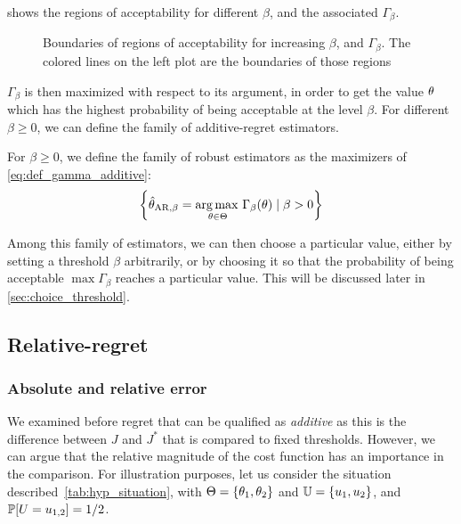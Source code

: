 \documentclass[../../Main_ManuscritThese.tex]{subfiles}
\newcommand\imgpath{/home/victor/acadwriting/Manuscrit/Text/Chapter3/img/}
\begin{document}
   shows the regions of acceptability for different $\beta$, and the associated $\Gamma_{\beta}$.

\begin{figure}[ht]
  \centering
  
  \caption{\label{fig:gamma_beta_increasing} Boundaries of regions of acceptability for increasing $\beta$, and $\Gamma_{\beta}$. The colored lines on the left plot are the boundaries of those regions}
\end{figure}


  $\Gamma_{\beta}$ is then maximized with respect to its argument, in order to get the value $\theta$ which has the highest probability of being acceptable at the level $\beta$. For different $\beta \geq 0$, we can define the family of additive-regret  estimators.

  
  \begin{definition}
    For $\beta \geq 0$, we define the family of robust estimators as the maximizers of \cref{eq:def_gamma_additive}:
    \begin{equation}
      \left\{\estimtxt{\kk}{AR,\beta} = \argmax_{\kk\in\Kspace} \Gamma_{\beta}(\kk) \mid \beta > 0\right\} %
    \end{equation}
  \end{definition}
  Among this family of estimators, we can then choose a particular value, either by setting a threshold $\beta$ arbitrarily, or by choosing it so that the probability of being acceptable $\max \Gamma_{\beta}$ reaches a particular value. This will be discussed later in \cref{sec:choice_threshold}.


  \subsection{Relative-regret}
  \subsubsection{Absolute and relative error}
  \label{ssec:hyp_situation}
We examined before regret that can be qualified as \emph{additive} as this is the difference between $J$ and $J^*$ that is compared to fixed thresholds.
However, we can argue that the relative magnitude of the cost function has an importance in the comparison. For illustration purposes, let us consider the situation described~\cref{tab:hyp_situation}, with $\Theta = \{\theta_1, \theta_2\}$ and $\mathbb{U} = \{u_1, u_2\}$, and $\mathbb{P}[U = u_{1, 2}] = 1/2$.
\end{document}
